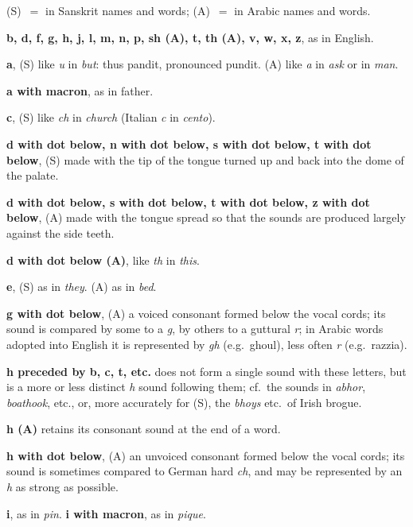 \documentclass[11pt,a4paper]{article}
\begin{document}
(S)~$=$ in Sanskrit names and words; (A)~$=$ in Arabic names and words.

\medskip
\noindent\textbf{b, d, f, g, h, j, l, m, n, p, sh (A), t, th (A), v, w, x, z}, as in English.

\smallskip
\noindent\textbf{a}, (S) like \textit{u} in \textit{but}: thus pandit, pronounced pundit. (A) like \textit{a} in \textit{ask} or in \textit{man}.

\smallskip
\noindent\textbf{a with macron}, as in father.

\smallskip
\noindent\textbf{c}, (S) like \textit{ch} in \textit{church} (Italian \textit{c} in \textit{cento}).

\smallskip
\noindent\textbf{d with dot below, n with dot below, s with dot below, t with dot below}, (S) made with the tip of the tongue turned up and back into the dome of the palate.

\smallskip
\noindent\textbf{d with dot below, s with dot below, t with dot below, z with dot below}, (A) made with the tongue spread so that the sounds are produced largely against the side teeth.

\smallskip
\noindent\textbf{d with dot below (A)}, like \textit{th} in \textit{this}.

\smallskip
\noindent\textbf{e}, (S) as in \textit{they}. (A) as in \textit{bed}.

\smallskip
\noindent\textbf{g with dot below}, (A) a voiced consonant formed below the vocal cords; its sound is compared by some to a \textit{g}, by others to a guttural \textit{r}; in Arabic words adopted into English it is represented by \textit{gh} (e.g.\ ghoul), less often \textit{r} (e.g.\ razzia).

\smallskip
\noindent\textbf{h preceded by b, c, t, etc.} does not form a single sound with these letters, but is a more or less distinct \textit{h} sound following them; cf.\ the sounds in \textit{abhor}, \textit{boathook}, etc., or, more accurately for (S), the \textit{bhoys} etc.\ of Irish brogue.

\smallskip
\noindent\textbf{h (A)} retains its consonant sound at the end of a word.

\smallskip
\noindent\textbf{h with dot below}, (A) an unvoiced consonant formed below the vocal cords; its sound is sometimes compared to German hard \textit{ch}, and may be represented by an \textit{h} as strong as possible.

\smallskip
\noindent\textbf{i}, as in \textit{pin}. \textbf{i with macron}, as in \textit{pique}.
\end{document}
